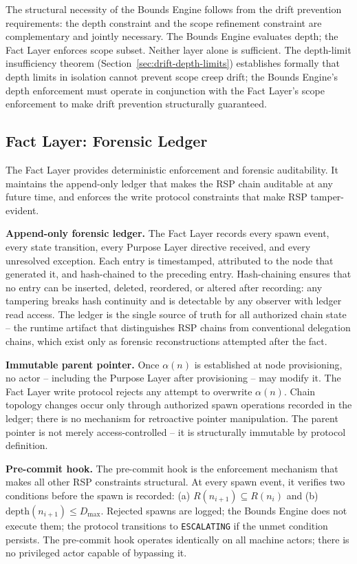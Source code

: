 The structural necessity of the Bounds Engine follows from the drift prevention requirements: the depth constraint and the scope refinement constraint are complementary and jointly necessary. The Bounds Engine evaluates depth; the Fact Layer enforces scope subset. Neither layer alone is sufficient. The depth-limit insufficiency theorem (Section~\ref{sec:drift-depth-limits}) establishes formally that depth limits in isolation cannot prevent scope creep drift; the Bounds Engine's depth enforcement must operate in conjunction with the Fact Layer's scope enforcement to make drift prevention structurally guaranteed.

\subsection{Fact Layer: Forensic Ledger}
\label{sec:rs-fact-ledger}

The Fact Layer provides deterministic enforcement and forensic auditability. It maintains the append-only ledger that makes the RSP chain auditable at any future time, and enforces the write protocol constraints that make RSP tamper-evident.

\medskip
\noindent\textbf{Append-only forensic ledger.} The Fact Layer records every spawn event, every state transition, every Purpose Layer directive received, and every unresolved exception. Each entry is timestamped, attributed to the node that generated it, and hash-chained to the preceding entry. Hash-chaining ensures that no entry can be inserted, deleted, reordered, or altered after recording: any tampering breaks hash continuity and is detectable by any observer with ledger read access. The ledger is the single source of truth for all authorized chain state -- the runtime artifact that distinguishes RSP chains from conventional delegation chains, which exist only as forensic reconstructions attempted after the fact.

\medskip
\noindent\textbf{Immutable parent pointer.} Once $\alpha(n)$ is established at node provisioning, no actor -- including the Purpose Layer after provisioning -- may modify it. The Fact Layer write protocol rejects any attempt to overwrite $\alpha(n)$. Chain topology changes occur only through authorized spawn operations recorded in the ledger; there is no mechanism for retroactive pointer manipulation. The parent pointer is not merely access-controlled -- it is structurally immutable by protocol definition.

\medskip
\noindent\textbf{Pre-commit hook.} The pre-commit hook is the enforcement mechanism that makes all other RSP constraints structural. At every spawn event, it verifies two conditions before the spawn is recorded: (a) $R(n_{i+1}) \subseteq R(n_i)$ and (b) $\mathrm{depth}(n_{i+1}) \leq D_{\mathrm{max}}$. Rejected spawns are logged; the Bounds Engine does not execute them; the protocol transitions to \texttt{ESCALATING} if the unmet condition persists. The pre-commit hook operates identically on all machine actors; there is no privileged actor capable of bypassing it.

